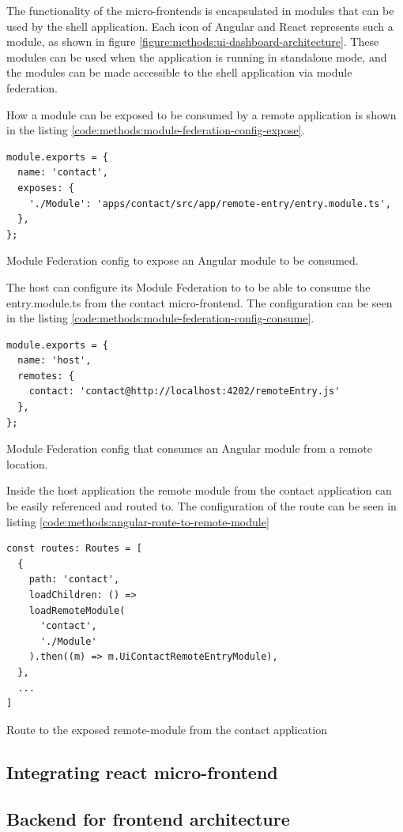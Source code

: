 The functionality of the micro-frontends is encapsulated in modules that can be used by the shell application. Each icon of Angular and React represents such a module, as shown in figure \ref{figure:methods:ui-dashboard-architecture}. These modules can be used when the application is running in standalone mode, and the modules can be made accessible to the shell application via module federation.

How a module can be exposed to be consumed by a remote application is shown in the listing \ref{code:methods:module-federation-config-expose}.

\ifshowListings
\begin{listing}[H]
\begin{verbatim}
module.exports = {
  name: 'contact',
  exposes: {
    './Module': 'apps/contact/src/app/remote-entry/entry.module.ts',
  },
};
\end{verbatim}
\caption{Module Federation config to expose an Angular module to be consumed.}\label{code:methods:module-federation-config-expose}
\end{listing}
\fi

The host can configure its Module Federation to to be able to consume the entry.module.ts from the contact micro-frontend. The configuration can be seen in the listing \ref{code:methods:module-federation-config-consume}.

\ifshowListings
\begin{listing}[H]
\begin{verbatim}
module.exports = {
  name: 'host',
  remotes: {
    contact: 'contact@http://localhost:4202/remoteEntry.js'
  },
};
\end{verbatim}
\caption{Module Federation config that consumes an Angular module from a remote location.}\label{code:methods:module-federation-config-consume}
\end{listing}
\fi

Inside the host application the remote module from the contact application can be easily referenced and routed to. The configuration of the route can be seen in listing \ref{code:methods:angular-route-to-remote-module}

\ifshowListings
\begin{listing}[H]
\begin{verbatim}
const routes: Routes = [
  {
    path: 'contact',
    loadChildren: () =>
    loadRemoteModule(
      'contact',
      './Module'
    ).then((m) => m.UiContactRemoteEntryModule),
  },
  ...
]
\end{verbatim}
\caption{Route to the exposed remote-module from the contact application}\label{code:methods:angular-route-to-remote-module}
\end{listing}
\fi



\subsection{Integrating react micro-frontend}

\subsection{Backend for frontend architecture}